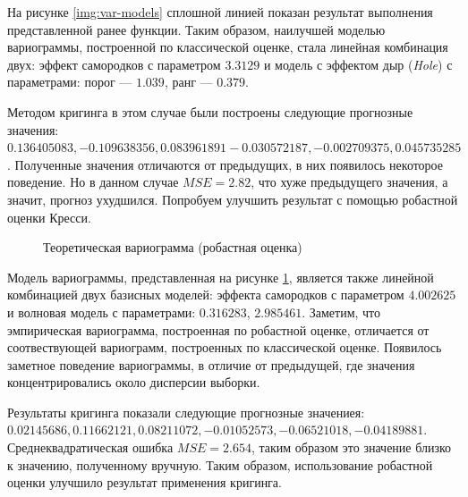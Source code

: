 На рисунке \ref{img:var-models} сплошной линией показан результат выполнения представленной ранее функции. Таким образом, наилучшей моделью вариограммы, построенной по классической оценке, стала линейная комбинация двух: эффект самородков с параметром $3.3129$ и модель с эффектом дыр (\textit{Hole}) с параметрами: порог --- $1.039$, ранг --- $0.379$.

Методом кригинга в этом случае были построены следующие прогнозные значения: $0.136405083, -0.109638356,  0.083961891 -0.030572187, -0.002709375,  0.045735285$. Полученные значения отличаются от предыдущих, в них появилось некоторое поведение. Но в данном случае $ MSE = 2.82 $, что хуже предыдущего значения, а значит, прогноз ухудшился.
Попробуем улучшить результат с помощью робастной оценки Кресси.

\begin{figure}[ht]
\caption{Теоретическая вариограмма (робастная оценка)}
\label{img:robust-mod}
\end{figure}

Модель вариограммы, представленная на рисунке \ref{img:robust-mod}, является также линейной комбинацией двух базисных моделей: эффекта самородков с параметром $ 4.002625 $ и волновая модель с параметрами: $0.316283$, $2.985461$. Заметим, что эмпирическая вариограмма, построенная по робастной оценке, отличается от соотвествующей вариограмм, построенных по классической оценке. Появилось заметное поведение вариограммы, в отличие от предыдущей, где значения концентрировались около дисперсии выборки.

Результаты кригинга показали следующие прогнозные значениея: $0.02145686, 0.11662121, 0.08211072, -0.01052573, -0.06521018, -0.04189881$. Среднеквадратическая ошибка $ MSE = 2.654 $, таким образом это значение близко к значению, полученному вручную. Таким образом, использование робастной оценки улучшило результат применения кригинга.

